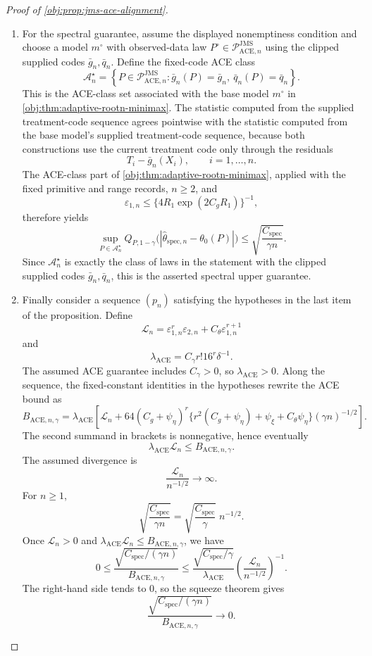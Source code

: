 \begin{proof}[Proof of \cref{obj:prop:jms-ace-alignment}]
\begin{enumerate}
\item For the spectral guarantee, assume the displayed nonemptiness condition
and choose a model \(m^{\circ}\) with observed-data law
\(P^{\circ}\in\mathcal P_{\mathrm{ACE},n}^{\mathrm{JMS}}\) using the clipped
supplied codes \(\bar g_n,\bar q_n\).  Define the fixed-code ACE class
\[
 \mathcal A_n^{\star}
 =
 \left\{
 P\in\mathcal P_{\mathrm{ACE},n}^{\mathrm{JMS}}:
 \bar g_n(P)=\bar g_n,\ \bar q_n(P)=\bar q_n
 \right\}.
\]
This is the ACE-class set associated with the base model \(m^{\circ}\) in
\cref{obj:thm:adaptive-rootn-minimax}.  The statistic computed from the
supplied treatment-code sequence agrees pointwise with the statistic computed
from the base model's supplied treatment-code sequence, because both
constructions use the current treatment code only through the residuals
\[
  T_i-\bar g_n(X_i),\qquad i=1,\ldots,n .
\]
The ACE-class part of \cref{obj:thm:adaptive-rootn-minimax}, applied with the
fixed primitive and range records, \(n\ge2\), and
\[
 \varepsilon_{1,n}
 \le
 \{4R_1\exp(2C_gR_1)\}^{-1},
\]
therefore yields
\[
 \sup_{P\in\mathcal A_n^{\star}}
 Q_{P,1-\gamma}
 \bigl(|\widehat\theta_{\mathrm{spec},n}-\theta_0(P)|\bigr)
 \le
 \sqrt{\frac{C_{\mathrm{spec}}}{\gamma n}} .
\]
Since \(\mathcal A_n^{\star}\) is exactly the class of laws in the statement
with the clipped supplied codes \(\bar g_n,\bar q_n\), this is the asserted
spectral upper guarantee.

\item Finally consider a sequence \((p_n)\) satisfying the hypotheses in the
last item of the proposition.  Define
\[
  \mathcal L_n
  =
  \varepsilon_{1,n}^r\varepsilon_{2,n}
  +C_{\theta}\varepsilon_{1,n}^{r+1}
\]
and
\[
  \lambda_{\mathrm{ACE}}
  =
  C_{\gamma}r!16^r\delta^{-1}.
\]
The assumed ACE guarantee includes \(C_{\gamma}>0\), so
\(\lambda_{\mathrm{ACE}}>0\).  Along the sequence, the fixed-constant
identities in the hypotheses rewrite the ACE bound as
\[
 B_{\mathrm{ACE},n,\gamma}
 =
 \lambda_{\mathrm{ACE}}
 \left[
   \mathcal L_n
   +
   64(C_g+\psi_{\eta})^r
   \{r^2(C_g+\psi_{\eta})+\psi_{\xi}+C_{\theta}\psi_{\eta}\}
   (\gamma n)^{-1/2}
 \right].
\]
The second summand in brackets is nonnegative, hence eventually
\[
  \lambda_{\mathrm{ACE}}\mathcal L_n
  \le B_{\mathrm{ACE},n,\gamma}.
\]
The assumed divergence is
\[
  \frac{\mathcal L_n}{n^{-1/2}}\longrightarrow\infty .
\]
For \(n\ge1\),
\[
 \sqrt{\frac{C_{\mathrm{spec}}}{\gamma n}}
 =
 \sqrt{\frac{C_{\mathrm{spec}}}{\gamma}}\;n^{-1/2}.
\]
Once \(\mathcal L_n>0\) and
\(\lambda_{\mathrm{ACE}}\mathcal L_n\le B_{\mathrm{ACE},n,\gamma}\), we have
\[
 0\le
 \frac{\sqrt{C_{\mathrm{spec}}/(\gamma n)}}{B_{\mathrm{ACE},n,\gamma}}
 \le
 \frac{\sqrt{C_{\mathrm{spec}}/\gamma}}{\lambda_{\mathrm{ACE}}}
 \left(\frac{\mathcal L_n}{n^{-1/2}}\right)^{-1}.
\]
The right-hand side tends to \(0\), so the squeeze theorem gives
\[
 \frac{
   \sqrt{C_{\mathrm{spec}}/(\gamma n)}
 }{
   B_{\mathrm{ACE},n,\gamma}
 }
 \longrightarrow 0 .
\]
\end{enumerate}
\end{proof}

